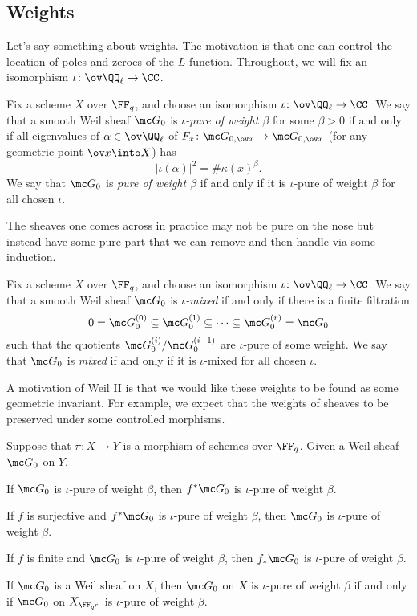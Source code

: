 \documentclass[../notes.tex]{subfiles}
\begin{document}
\subsection{Weights}
Let's say something about weights. The motivation is that one can control the location of poles and zeroes of the $L$-function. Throughout, we will fix an isomorphism $\iota\colon\ov\QQ_\ell\to\CC$.
\begin{definition}[pure]
	Fix a scheme $X$ over $\FF_q$, and choose an isomorphism $\iota\colon\ov\QQ_\ell\to\CC$. We say that a smooth Weil sheaf $\mc G_0$ is \textit{$\iota$-pure of weight $\beta$} for some $\beta>0$ if and only if all eigenvalues of $\alpha\in\ov\QQ_\ell$ of $F_x\colon\mc G_{0,\ov x}\to\mc G_{0,\ov x}$ (for any geometric point $\ov x\into X$) has
	\[\left|\iota(\alpha)\right|^2=\#\kappa(x)^\beta.\]
	We say that $\mc G_0$ is \textit{pure of weight $\beta$} if and only if it is $\iota$-pure of weight $\beta$ for all chosen $\iota$.
\end{definition}
The sheaves one comes across in practice may not be pure on the nose but instead have some pure part that we can remove and then handle via some induction.
\begin{definition}[mixed]
	Fix a scheme $X$ over $\FF_q$, and choose an isomorphism $\iota\colon\ov\QQ_\ell\to\CC$. We say that a smooth Weil sheaf $\mc G_0$ is \textit{$\iota$-mixed} if and only if there is a finite filtration
	\[0=\mc G_0^{(0)}\subseteq\mc G_0^{(1)}\subseteq\cdots\subseteq\mc G_0^{(r)}=\mc G_0\]
	such that the quotients $\mc G_0^{(i)}/\mc G_{0}^{(i-1)}$ are $\iota$-pure of some weight. We say that $\mc G_0$ is \textit{mixed} if and only if it is $\iota$-mixed for all chosen $\iota$.
\end{definition}
A motivation of Weil II is that we would like these weights to be found as some geometric invariant. For example, we expect that the weights of sheaves to be preserved under some controlled morphisms.
\begin{proposition}
	Suppose that $\pi\colon X\to Y$ is a morphism of schemes over $\FF_q$. Given a Weil sheaf $\mc G_0$ on $Y$.
	\begin{listalph}
		\item If $\mc G_0$ is $\iota$-pure of weight $\beta$, then $f^*\mc G_0$ is $\iota$-pure of weight $\beta$.
		\item If $f$ is surjective and $f^*\mc G_0$ is $\iota$-pure of weight $\beta$, then $\mc G_0$ is $\iota$-pure of weight $\beta$.
		\item If $f$ is finite and $\mc G_0$ is $\iota$-pure of weight $\beta$, then $f_*\mc G_0$ is $\iota$-pure of weight $\beta$.
		\item If $\mc G_0$ is a Weil sheaf on $X$, then $\mc G_0$ on $X$ is $\iota$-pure of weight $\beta$ if and only if $\mc G_0$ on $X_{\FF_{q^r}}$ is $\iota$-pure of weight $\beta$.
	\end{listalph}
\end{proposition}
\end{document}
